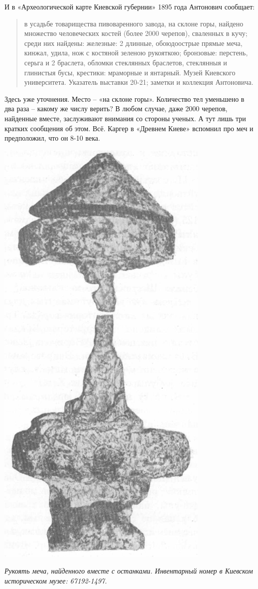 И в «Археологической карте Киевской губернии»\cite{antonovich01} 1895 года Антонович сообщает:

\begin{quotation}
в усадьбе товарищества пивоваренного завода, на склоне горы, найдено множество человеческих костей (более 2000 черепов), сваленных в кучу; среди них найдены: железные: 2 длинные, обо\-юдоострые прямые меча, кинжал, удила, нож с костяной зеленою рукояткою; бронзовые: перстень, серьга и 2 браслета, обломки стеклянных браслетов, стеклянныя и глинистыя бусы, крестики: мраморные и янтарный. Музей Киевского университета. Указатель выставки 20-21; заметки и коллекция Антоновича.
\end{quotation}

Здесь уже уточнения. Место – «на склоне горы». Количество тел уменьшено в два раза – какому же числу верить? В любом случае, даже 2000 черепов, найденные вместе, заслуживают внимания со стороны ученых. А тут лишь три кратких сообщения об этом. Всё. Каргер в «Древнем Киеве»\cite{karger01} вспомнил про меч и предположил, что он 8-10 века.

\begin{center}
\includegraphics[width=0.45\linewidth]{chast-kirvys/lys02/4000-mech.png}

\textit{Рукоять меча, найденного вместе с останками. Инвентарный номер в Киевском историческом музее: 67192-1497.}
\end{center}

